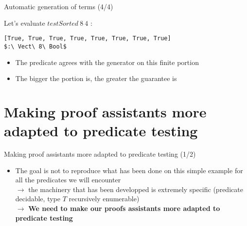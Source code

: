 \documentclass[french]{beamer}
\begin{document}
\begin{frame}[fragile]{Automatic generation of terms (4/4)}

Let's evaluate $testSorted\ 8\ 4$ :

\begin{lstlisting}
[True, True, True, True, True, True, True, True]
$:\ Vect\ 8\ Bool$
\end{lstlisting}


\begin{itemize}

\item The predicate agrees with the generator on this finite portion

\item The bigger the portion is, the greater the guarantee is

\end{itemize}


\end{frame}



\section{Making proof assistants more adapted to predicate testing}
\begin{frame}{Making proof assistants more adapted to predicate testing (1/2)}

		\begin{itemize}

\item The goal is not to reproduce what has been done on this simple example for all the predicates we will encounter \\
$\rightarrow$ the machinery that has been developped is extremely specific (predicate decidable, type $T$ recursively enumerable) \\
$\rightarrow$ \textbf{We need to make our proofs assistants more adapted to predicate testing}


\end{itemize}

\end{frame}
\end{document}
